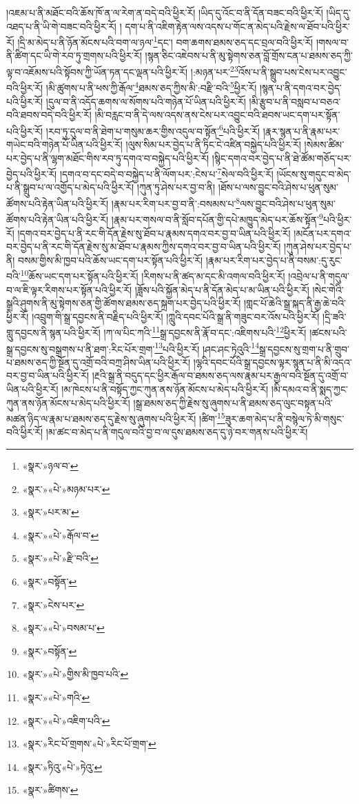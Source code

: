 །འཇམ་པ་ནི་མཐོང་བའི་ཆོས་ཁོ་ན་ལ་རེག་ན་བདེ་བའི་ཕྱིར་རོ། །ཡིད་དུ་འོང་བ་ནི་དོན་བཟང་བའི་ཕྱིར་རོ། །ཡིད་དུ་འཐད་པ་ནི་ཡི་གེ་བཟང་བའི་ཕྱིར་རོ། །
དག་པ་ནི་འཇིག་རྟེན་ལས་འདས་པ་གོང་ན་མེད་པའི་རྗེས་ལ་ཐོབ་པའི་ཕྱིར་རོ། །དྲི་མ་མེད་པ་ནི་ཉོན་མོངས་པའི་བག་ལ་ཉལ་\footnote{«སྣར་»ཉལ་བ་}དང་། བག་ཆགས་ཐམས་ཅད་དང་བྲལ་བའི་ཕྱིར་རོ། །གསལ་བ་ནི་ཚིག་དང་ཡི་གེ་རབ་ཏུ་གྲགས་པའི་ཕྱིར་རོ། །སྙན་ཅིང་འཇེབས་པ་ནི་མུ་སྟེགས་ཅན་བློ་གྲོས་ངན་པ་ཐམས་ཅད་ཀྱི་ལྟ་བ་འཇོམས་པའི་སྟོབས་ཀྱི་ཡོན་ཏན་དང་ལྡན་པའི་ཕྱིར་རོ། །:མཉན་པར་\footnote{«སྣར་»«པེ་»མཉམ་པར་}\footnote{«སྣར་»པར་མ་}འོས་པ་ནི་སྒྲུབ་པས་ངེས་པར་འབྱུང་བའི་ཕྱིར་རོ། །མི་ཚུགས་པ་ནི་ཕས་ཀྱི་རྒོལ་\footnote{«སྣར་»«པེ་»རྒོལ་བ་}ཐམས་ཅད་ཀྱིས་མི་:བརྫི་བའི་\footnote{«སྣར་»«པེ་»རྫི་བའི་}ཕྱིར་རོ། །སྙན་པ་ནི་དགའ་བར་བྱེད་པའི་ཕྱིར་རོ། །དུལ་བ་ནི་འདོད་ཆགས་ལ་སོགས་པའི་གཉེན་པོ་ཡིན་པའི་ཕྱིར་རོ། །མི་རྩུབ་པ་ནི་བསླབ་པ་བཅའ་བའི་ཐབས་བདེ་བའི་ཕྱིར་རོ། །མི་བརླང་བ་ནི་དེ་ལས་འདས་ནས་ངེས་པར་འབྱུང་བའི་ཐབས་ཡང་དག་པར་སྟོན་པའི་ཕྱིར་རོ། །རབ་ཏུ་དུལ་བ་ནི་ཐེག་པ་གསུམ་ཆར་གྱིས་འདུལ་བ་སྟོན་\footnote{«སྣར་»བསྟོན་}པའི་ཕྱིར་རོ། །རྣར་སྙན་པ་ནི་རྣམ་པར་གཡེང་བའི་གཉེན་པོ་ཡིན་པའི་ཕྱིར་རོ། །ལུས་སིམ་པར་བྱེད་པ་ནི་ཏིང་ངེ་འཛིན་བསྐྱེད་པའི་ཕྱིར་རོ། །སེམས་ཚིམ་པར་བྱེད་པ་ནི་ལྷག་མཐོང་གིས་རབ་ཏུ་དགའ་བ་བསྐྱེད་པའི་ཕྱིར་རོ། །སྙིང་དགའ་བར་བྱེད་པ་ནི་ཐེ་ཚོམ་གཅོད་པར་བྱེད་པའི་ཕྱིར་རོ། །དགའ་བ་དང་བདེ་བ་བསྐྱེད་པ་ནི་ལོག་པར་:ངེས་པ་\footnote{«སྣར་»ངེས་པར་}སེལ་བའི་ཕྱིར་རོ། །ཡོངས་སུ་གདུང་བ་མེད་པ་ནི་སྒྲུབ་པ་ལ་འགྱོད་པ་མེད་པའི་ཕྱིར་རོ། །ཀུན་ཏུ་ཤེས་པར་བྱ་བ་ནི། །ཐོས་པ་ལས་བྱུང་བའི་ཤེས་པ་ཕུན་སུམ་ཚོགས་པའི་རྟེན་ཡིན་པའི་ཕྱིར་རོ། །རྣམ་པར་རིག་པར་བྱ་བ་ནི་:བསམས་པ་\footnote{«སྣར་»«པེ་»བསམ་པ་}ལས་བྱུང་བའི་ཤེས་པ་ཕུན་སུམ་ཚོགས་པའི་རྟེན་ཡིན་པའི་ཕྱིར་རོ། །རྣམ་པར་གསལ་བ་ནི་སློབ་དཔོན་གྱི་དཔེ་མཁྱུད་མེད་པར་ཆོས་སྟོན་\footnote{«སྣར་»བསྟོན་}པའི་ཕྱིར་རོ། །དགའ་བར་བྱེད་པ་ནི་རང་གི་དོན་རྗེས་སུ་ཐོབ་པ་རྣམས་དགའ་བར་བྱ་བ་ཡིན་པའི་ཕྱིར་རོ། །མངོན་པར་དགའ་བར་བྱེད་པ་ནི་རང་གི་དོན་རྗེས་སུ་མ་ཐོབ་པ་རྣམས་ཀྱིས་དགའ་བར་བྱ་བ་ཡིན་པའི་ཕྱིར་རོ། །ཀུན་ཤེས་པར་བྱེད་པ་ནི། བསམ་གྱིས་མི་ཁྱབ་པའི་ཆོས་ཡང་དག་པར་སྟོན་པའི་ཕྱིར་རོ། །རྣམ་པར་རིག་པར་བྱེད་པ་ནི་བསམ་:དུ་རུང་བའི་\footnote{«སྣར་»«པེ་»གྱིས་མི་ཁྱབ་པའི་}ཆོས་ཡང་དག་པར་སྟོན་པའི་ཕྱིར་རོ། །རིགས་པ་ནི་ཚད་མ་དང་མི་འགལ་བའི་ཕྱིར་རོ། །འབྲེལ་པ་ནི་གདུལ་བ་ལ་ཇི་ལྟར་རིགས་པར་སྟོན་པའི་ཕྱིར་རོ། །ཟློས་པའི་སྐྱོན་མེད་པ་ནི་དོན་མེད་པ་མ་ཡིན་པའི་ཕྱིར་རོ། །སེང་གེའི་སྒྲའི་ཤུགས་ནི་མུ་སྟེགས་ཅན་གྱི་ཚོགས་ཐམས་ཅད་སྐྲག་པར་བྱེད་པའི་ཕྱིར་རོ། །གླང་པོ་ཆེའི་སྒྲ་སྐད་ནི་རྒྱ་ཆེ་བའི་ཕྱིར་རོ། །འབྲུག་གི་སྒྲ་དབྱངས་ནི་བརྗིད་པའི་ཕྱིར་རོ། །ཀླུའི་དབང་པོའི་སྒྲ་ནི་གཟུང་བར་འོས་པའི་ཕྱིར་རོ། །དྲི་ཟའི་གླུ་དབྱངས་ནི་སྙན་པའི་ཕྱིར་རོ། །ཀ་ལ་པིང་ཀའི་\footnote{«སྣར་»«པེ་»གའི་}སྒྲ་དབྱངས་ནི་རྣོ་བ་དང་:འཇིགས་པའི་\footnote{«སྣར་»«པེ་»འཇིག་པའི་}ཕྱིར་རོ། །ཚངས་པའི་སྒྲ་དབྱངས་སུ་བསྒྲགས་པ་ནི་ཐག་:རིང་པོར་གྲག་\footnote{«སྣར་»རིང་པོ་གྲགས་«པེ་»རིང་པོ་གྲག་}པའི་ཕྱིར་རོ། །ཤང་ཤང་ཏེའུའི་\footnote{«སྣར་»ཏིའུ་«པེ་»ཏེའུ་}སྒྲ་དབྱངས་སུ་གྲག་པ་ནི་གྲུབ་པ་ཐམས་ཅད་ཀྱི་སྔོན་དུ་འགྲོ་བའི་བཀྲ་ཤིས་ཡིན་པའི་ཕྱིར་རོ། །ལྷའི་དབང་པོའི་སྒྲ་དབྱངས་ལྟར་སྙན་པ་ནི་མི་འདའ་བར་བྱ་བ་ཡིན་པའི་ཕྱིར་རོ། །རྔའི་སྒྲ་ནི་བདུད་དང་ཕྱིར་རྒོལ་བ་ཐམས་ཅད་ལས་རྣམ་པར་རྒྱལ་བའི་སྔོན་དུ་འགྲོ་བ་ཡིན་པའི་ཕྱིར་རོ། །མ་ཁེངས་པ་ནི་བསྟོད་ཀྱང་ཀུན་ནས་ཉོན་མོངས་པ་མེད་པའི་ཕྱིར་རོ། །མི་དམའ་བ་ནི་སྨད་ཀྱང་ཀུན་ནས་ཉོན་མོངས་པ་མེད་པའི་ཕྱིར་རོ། །སྒྲ་ཐམས་ཅད་ཀྱི་རྗེས་སུ་ཞུགས་པ་ནི་ཐམས་ཅད་ལུང་བསྟན་པའི་མཚན་ཉིད་ལ་རྣམ་པ་ཐམས་ཅད་དུ་རྗེས་སུ་ཞུགས་པའི་ཕྱིར་རོ། །ཚིག་\footnote{«སྣར་»ཚིགས་}ཟུར་ཆག་མེད་པ་ནི་བསྙེལ་ཏེ་མི་གསུང་བའི་ཕྱིར་རོ། །མ་ཚང་བ་མེད་པ་ནི་གདུལ་བའི་བྱ་བ་ལ་དུས་ཐམས་ཅད་དུ་ཉེ་བར་གནས་པའི་ཕྱིར་རོ། 